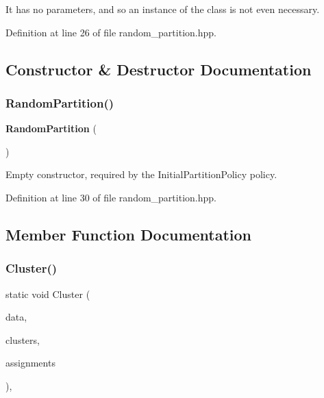 It has no parameters, and so an instance of the class is not even necessary. 

Definition at line 26 of file random\+\_\+partition.\+hpp.



\subsection{Constructor \& Destructor Documentation}
\mbox{\label{classmlpack_1_1kmeans_1_1RandomPartition_ac9affc7889d9b8911bb695c6855896e1}} 
\subsubsection{Random\+Partition()}
{\footnotesize\ttfamily \textbf{ Random\+Partition} (\begin{DoxyParamCaption}{ }\end{DoxyParamCaption})\hspace{0.3cm}{\ttfamily [inline]}}



Empty constructor, required by the Initial\+Partition\+Policy policy. 



Definition at line 30 of file random\+\_\+partition.\+hpp.



\subsection{Member Function Documentation}
\mbox{\label{classmlpack_1_1kmeans_1_1RandomPartition_a66c98fbe18c8952d61e996c723860a81}} 
\subsubsection{Cluster()}
{\footnotesize\ttfamily static void Cluster (\begin{DoxyParamCaption}\item[{const Mat\+Type \&}]{data,  }\item[{const size\+\_\+t}]{clusters,  }\item[{arma\+::\+Row$<$ size\+\_\+t $>$ \&}]{assignments }\end{DoxyParamCaption})\hspace{0.3cm}{\ttfamily [inline]}, {\ttfamily [static]}}



